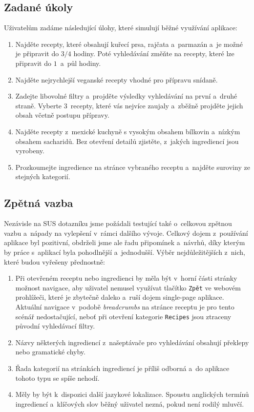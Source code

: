 \subsection{Zadané úkoly}

Uživatelům zadáme následující úlohy, které simulují běžné využívání aplikace:

\begin{enumerate}
    \item Najděte recepty, které obsahují kuřecí prsa, rajčata a~parmazán a~je možné je připravit do $3/4$ hodiny. Poté vyhledávání změňte na recepty, které lze připravit do $1$~a~půl hodiny.
    \item Najděte nejrychlejší veganské recepty vhodné pro přípravu snídaně.
    \item Zadejte libovolné filtry a~projděte výsledky vyhledávání na první a~druhé straně. Vyberte $3$~recepty, které vás nejvíce zaujaly a~zběžně projděte jejich obsah včetně postupu přípravy.
    \item Najděte recepty z~mexické kuchyně s vysokým obsahem bílkovin a~nízkým obsahem sacharidů. Bez otevření detailů zjistěte, z~jakých ingrediencí jsou vyrobeny.
    \item Prozkoumejte ingredience na stránce vybraného receptu a~najděte suroviny ze stejných kategorií.
\end{enumerate}

\subsection{Zpětná vazba}

Nezávisle na SUS dotazníku jsme požádali testující také o~celkovou zpětnou vazbu a~nápady na vylepšení v~rámci dalšího vývoje. Celkový dojem z~používání aplikace byl pozitivní, obdrželi jsme ale řadu připomínek a~návrhů, díky kterým by práce s~aplikací byla pohodlnější a~jednodušší. Výběr nejdůležitějších z~nich, které budou vyřešeny přednostně:

\begin{enumerate}
    \item Při otevřeném receptu nebo ingredienci by měla být v~horní části stránky možnost navigace, aby uživatel nemusel využívat tlačítko \texttt{Zpět} ve webovém prohlížeči, které je zbytečně daleko a~ruší dojem single-page aplikace. Aktuální navigace v~podobě \emph{breadcrumbs} na stránce receptu je pro tento scénář nedostačující, neboť při otevření kategorie \texttt{Recipes} jsou ztraceny původní vyhledávací filtry.
    \item Názvy některých ingrediencí z~našeptávače pro vyhledávání obsahují překlepy nebo gramatické chyby.
    \item Řada kategorií na stránkách ingrediencí je příliš odborná a~do aplikace tohoto typu se spíše nehodí.
    \item Měly by být k~dispozici další jazykové lokalizace. Spoustu anglických termínů ingrediencí a~klíčových slov běžný uživatel nezná, pokud není rodilý mluvčí.
\end{enumerate}

